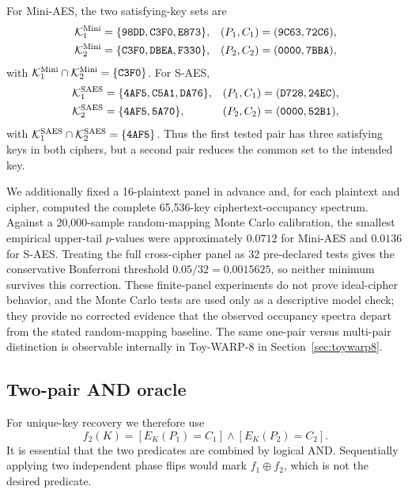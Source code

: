 \documentclass[10pt,a4paper]{article}
\begin{document}
For Mini-AES, the two satisfying-key sets are
\begin{align}
\mathcal{K}^{\rm Mini}_1
&=\{\mathtt{98DD},\mathtt{C3F0},\mathtt{E873}\},
& (P_1,C_1)&=(\mathtt{9C63},\mathtt{72C6}),\\
\mathcal{K}^{\rm Mini}_2
&=\{\mathtt{C3F0},\mathtt{DBEA},\mathtt{F330}\},
& (P_2,C_2)&=(\mathtt{0000},\mathtt{7BBA}),
\end{align}
with $\mathcal{K}^{\rm Mini}_1\cap\mathcal{K}^{\rm Mini}_2=\{\mathtt{C3F0}\}$.  For S-AES,
\begin{align}
\mathcal{K}^{\rm SAES}_1
&=\{\mathtt{4AF5},\mathtt{C5A1},\mathtt{DA76}\},
& (P_1,C_1)&=(\mathtt{D728},\mathtt{24EC}),\\
\mathcal{K}^{\rm SAES}_2
&=\{\mathtt{4AF5},\mathtt{5A70}\},
& (P_2,C_2)&=(\mathtt{0000},\mathtt{52B1}),
\end{align}
with $\mathcal{K}^{\rm SAES}_1\cap\mathcal{K}^{\rm SAES}_2=\{\mathtt{4AF5}\}$.  Thus the first tested pair has three satisfying keys in both ciphers, but a second pair reduces the common set to the intended key.

We additionally fixed a 16-plaintext panel in advance and, for each plaintext and cipher, computed the complete 65,536-key ciphertext-occupancy spectrum. Against a 20,000-sample random-mapping Monte Carlo calibration, the smallest empirical upper-tail $p$-values were approximately $0.0712$ for Mini-AES and $0.0136$ for S-AES. Treating the full cross-cipher panel as 32 pre-declared tests gives the conservative Bonferroni threshold $0.05/32=0.0015625$, so neither minimum survives this correction. These finite-panel experiments do not prove ideal-cipher behavior, and the Monte Carlo tests are used only as a descriptive model check; they provide no corrected evidence that the observed occupancy spectra depart from the stated random-mapping baseline. The same one-pair versus multi-pair distinction is observable internally in Toy-WARP-8 in Section~\ref{sec:toywarp8}.

\subsection{Two-pair AND oracle}
For unique-key recovery we therefore use
\begin{equation}
    f_2(K)=[E_K(P_1)=C_1]\land[E_K(P_2)=C_2].
    \label{eq:two_pair_pred}
\end{equation}
It is essential that the two predicates are combined by logical AND. Sequentially applying two independent phase flips would mark $f_1\oplus f_2$, which is not the desired predicate.
\end{document}
